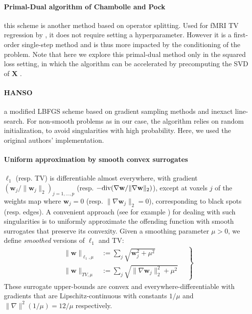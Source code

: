 \paragraph{Primal-Dual algorithm of Chambolle and Pock \citep{chambolle2010}}
this scheme is another method based on operator splitting.
Used for fMRI TV regression by \citep{gramfort-etal:2013a},
it does not require setting a hyperparameter.  %
However it is a first-order single-step method and is thus more impacted by the
conditioning of the problem. Note that here we explore this primal-dual
method only in the squared loss setting, in which the algorithm can be accelerated by
precomputing the SVD of $\mathbf{X}$ \citep{gramfort-etal:2013a}
.

\paragraph{HANSO \citep{lewis2008}}
a modified LBFGS scheme based on gradient 
sampling methods \citep{burke2005} and inexact
line-search. For non-smooth problems as in our case, the algorithm relies on
random initialization, to avoid singularities with high probability. 
Here, we used the original authors' implementation.

\paragraph{Uniform approximation by smooth convex surrogates}
$\ell_{1}$ (resp. TV) is differentiable almost everywhere,
with gradient $\left(\mathbf{w}_j/\|\textbf{w}_j\|_2\right)_{j=1,\ldots,p}$ (resp. $-\textrm{div} (\nabla \mathbf{w}/\|\nabla \mathbf{w}\|_2)$), except at voxels $j$ of the weights map where
$\mathbf{w}_j = 0$ (resp. $\|\nabla \mathbf{w}_j\|_2 =
0$), corresponding to black spots (resp. edges).  A convenient
approach (see for example \citep{NESTA, nesterov2005a, nesterov2005b,
  beck2012}) for dealing with such singularities is to uniformly
approximate the offending function with smooth surrogates that
preserve its convexity. Given  %
a smoothing parameter $\mu > 0$, we define \emph{smoothed} versions
of $\ell_1$ and TV:
%
\begin{eqnarray}
  \left.
  \begin{aligned}
    \|\mathbf{w}\|_{\ell_{1},\mu} &:= \sum_j
    \sqrt{\mathbf{w}_j^2 + \mu^2} \quad\\
    \|\mathbf{w}\|_{TV, \mu} &:=
    \sum_{j} \sqrt{\|\nabla \mathbf{w}_j\|_{2}^2 +
    \mu^2} \quad
    \end{aligned}
    \right\}
\end{eqnarray}
These surrogate upper-bounds are convex and everywhere-differentiable
with gradients that are Lipschitz-continuous with constants $1/\mu$ and
$\|\nabla\|^2(1/\mu) = 12 / \mu$ respectively.

